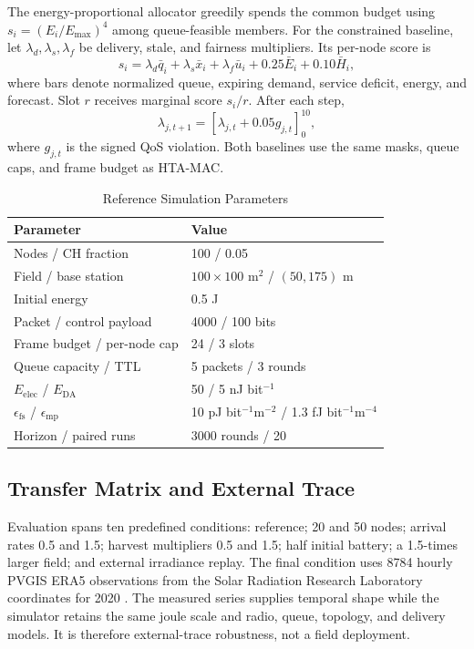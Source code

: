\documentclass[journal]{IEEEtran}
\newcommand{\method}{HTA-MAC}
\begin{document}
The energy-proportional allocator greedily spends the common budget using
$s_i=(E_i/E_{\max})^4$ among queue-feasible members. For the constrained
baseline, let $\lambda_d,\lambda_s,\lambda_f$ be delivery, stale, and fairness
multipliers. Its per-node score is
\begin{equation}
 s_i=\lambda_d\bar q_i+\lambda_s\bar x_i+\lambda_f\bar u_i
      +0.25\bar E_i+0.10\bar H_i,
 \label{eq:primal_score}
\end{equation}
where bars denote normalized queue, expiring demand, service deficit, energy,
and forecast. Slot $r$ receives marginal score $s_i/r$. After each step,
\begin{equation}
 \lambda_{j,t+1}=\left[\lambda_{j,t}+0.05g_{j,t}\right]_{0}^{10},
 \label{eq:dual_update}
\end{equation}
where $g_{j,t}$ is the signed QoS violation. Both baselines use the same masks,
queue caps, and frame budget as \method{}.

\begin{table}[t]
\centering
\caption{Reference Simulation Parameters}
\label{tab:parameters}
\small
\begin{tabular}{@{}ll@{}}
\toprule
Parameter & Value \\
\midrule
Nodes / CH fraction & 100 / 0.05 \\
Field / base station & $100\times100$ m$^2$ / $(50,175)$ m \\
Initial energy & 0.5 J \\
Packet / control payload & 4000 / 100 bits \\
Frame budget / per-node cap & 24 / 3 slots \\
Queue capacity / TTL & 5 packets / 3 rounds \\
$E_{\mathrm{elec}}$ / $E_{\mathrm{DA}}$ & 50 / 5 nJ bit$^{-1}$ \\
$\epsilon_{\mathrm{fs}}$ / $\epsilon_{\mathrm{mp}}$ & 10 pJ bit$^{-1}$m$^{-2}$ / 1.3 fJ bit$^{-1}$m$^{-4}$ \\
Horizon / paired runs & 3000 rounds / 20 \\
\bottomrule
\end{tabular}
\end{table}

\subsection{Transfer Matrix and External Trace}

Evaluation spans ten predefined conditions: reference; 20 and 50 nodes; arrival rates 0.5 and
1.5; harvest multipliers 0.5 and 1.5; half initial battery; a 1.5-times larger
field; and external irradiance replay. The final condition uses 8784 hourly
PVGIS ERA5 observations from the Solar Radiation Research Laboratory
coordinates for 2020 \cite{pvgis2020}. The measured series supplies temporal
shape while the simulator retains the same joule scale and radio, queue,
topology, and delivery models. It is therefore external-trace robustness, not
a field deployment.
\end{document}
